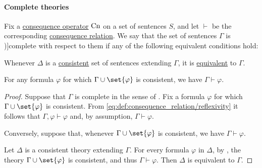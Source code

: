 \paragraph{Complete theories}

\begin{definition}\label{def:complete_set_of_sentences}
  Fix a \hyperref[def:consequence_operator]{consequence operator} \( \op{Cn} \) on a set of sentences \( S \), and let \( {\vdash} \) be the corresponding \hyperref[def:consequence_relation]{consequence relation}. We say that the set of sentences \( \Gamma \) is \term[ru=полное (множество формул) (\cite[def. 1.3.16]{Герасимов2011})]{complete} with respect to them if any of the following equivalent conditions hold:
  \begin{thmenum}
     Whenever \( \Delta \) is a \hyperref[def:consistent_set_of_sentences]{consistent} set of sentences extending \( \Gamma \), it is \hyperref[def:logical_theory/equivalent]{equivalent} to \( \Gamma \).

     For any formula \( \varphi \) for which \( \Gamma \cup \set{ \varphi } \) is consistent, we have \( \Gamma \vdash \varphi \).
  \end{thmenum}
\end{definition}
\begin{proof}
   Suppose that \( \Gamma \) is complete in the sense of . Fix a formula \( \varphi \) for which \( \Gamma \cup \set{ \varphi } \) is consistent. From \eqref{eq:def:consequence_relation/reflexivity} it follows that \( \Gamma, \varphi \vdash \varphi \) and, by assumption, \( \Gamma \vdash \varphi \).

   Conversely, suppose that, whenever \( \Gamma \cup \set{ \varphi } \) is consistent, we have \( \Gamma \vdash \varphi \).

  Let \( \Delta \) is a consistent theory extending \( \Gamma \). For every formula \( \varphi \) in \( \Delta \), by , the theory \( \Gamma \cup \set{ \varphi } \) is consistent, and thus \( \Gamma \vdash \varphi \). Then \( \Delta \) is equivalent to \( \Gamma \).
\end{proof}

